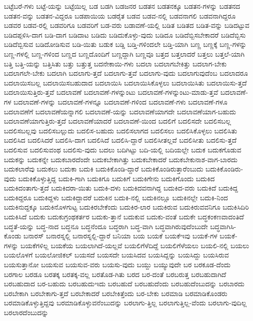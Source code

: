 {ಬಟ್ಟೆಬರೆ-ಗಳು
ಬಟ್ಟೆ-ಯನ್ನು
ಬಟ್ಟೆಯಿಲ್ಲ
ಬಡ
ಬಡಗಿ
ಬಡಜನರ
ಬಡತನ
ಬಡತನಕ್ಕೂ
ಬಡತನ-ಗಳನ್ನು
ಬಡತನದ
ಬಡತನ-ವನ್ನು
ಬಡತನ-ವಿದ್ದರೂ
ಬಡಪಾಯಿಯ
ಬಡರೈತ
ಬಡವ
ಬಡವ-ನಲ್ಲಿ
ಬಡವನಾಗಲಿ
ಬಡವನಾಗಿದ್ದರೂ
ಬಡವರ
ಬಡವ-ರಲ್ಲಿ
ಬಡವರಿಗೂ
ಬಡವರಿಗೆ
ಬಡ-ವರು
ಬಡಾವಣೆ-ಯಲ್ಲಿ
ಬಡಿತ
ಬಡಿತದ
ಬಡಿತ-ವನ್ನು
ಬಡಿದಟ್ಟುವ
ಬಡಿದಪ್ಪಳಿಸಿ-ದಾಗ
ಬಡಿ-ದಾಗ
ಬಡಿದಾಟ
ಬಡಿದು
ಬಡಿದುಕೊಳ್ಳು-ವುದು
ಬಡಿದೂ
ಬಡಿದೆಬ್ಬಿಸಬೇಕಾದರೆ
ಬಡಿದೆಬ್ಬಿಸು
ಬಡಿದೆಬ್ಬಿಸುವ
ಬಡಿದೋಡಿಸುವ
ಬಡಿ-ಯಿತು
ಬಡುಕ
ಬಡ್ಡಿ
ಬಡ್ತಿ-ಗಳಿಂದಲೇ
ಬಡ್ತಿ-ಯಾಗಿ
ಬಣ್ಣ
ಬಣ್ಣಕ್ಕೆ
ಬಣ್ಣ-ಗಳನ್ನು
ಬಣ್ಣ-ಗಳಲ್ಲಿ
ಬಣ್ಣ-ಗಳಿಂದ
ಬಣ್ಣದ
ಬಣ್ಣದೊಂದಿಗೆ
ಬಣ್ಣದ್ದಾಗಿ
ಬಣ್ಣವೂ
ಬತ್ತದ
ಬತ್ತಲಾದರೆ
ಬತ್ತಲು
ಬತ್ತಲೆ-ಯಾಗಿ
ಬತ್ತಿ
ಬತ್ತಿ-ಯನ್ನು
ಬತ್ತಿಸಿತು
ಬತ್ತು
ಬತ್ತುತ್ತ
ಬದನೇಕಾಯಿ-ಗಳು
ಬದಲಾ
ಬದಲಾಗಬೇಕಿತ್ತು
ಬದಲಾಗ-ಬೇಕು
ಬದಲಾಗಲೇ-ಬೇಕು
ಬದಲಾಗಿ
ಬದಲಾಗು-ತ್ತದೆ
ಬದಲಾಗು-ತ್ತವೆ
ಬದಲಾಗು-ವುದು
ಬದಲಾಗುವುದೆಂಬ
ಬದಲಾದರೂ
ಬದಲಾಯಿಸಬಲ್ಲ
ಬದಲಾಯಿಸಬಹುದಾದ
ಬದಲಾಯಿಸಿ
ಬದಲಾಯಿಸಿಕೊಳ್ಳಲು
ಬದಲಾಯಿಸಿತು
ಬದಲಾಯಿಸು-ತ್ತದೆ
ಬದಲಾಯಿಸುತ್ತಿರು-ತ್ತವೆ
ಬದಲಾವಣೆ
ಬದಲಾವಣೆ-ಗಳನ್ನುಂಟು
ಬದಲಾವಣೆ-ಗಳನ್ನುಂಟು-ಮಾಡು-ತ್ತವೆ
ಬದಲಾವಣೆ-ಗಳ
ಬದಲಾವಣೆ-ಗಳನ್ನು
ಬದಲಾವಣೆ-ಗಳನ್ನೂ
ಬದಲಾವಣೆ-ಗಳಿಂದ
ಬದಲಾವಣೆ-ಗಳು
ಬದಲಾವಣೆ-ಗಳೂ
ಬದಲಾವಣೆಗೆ
ಬದಲಾವಣೆಯನ್ನಾಗಲಿ
ಬದಲಾವಣೆ-ಯನ್ನು
ಬದಲಾವಣೆಯಾಗದೇ
ಬದಲಾವಣೆಯಾಗ-ಬಹುದು
ಬದಲಾವಣೆಯಾಗುತ್ತಿರು-ತ್ತದೆ
ಬದಲಾವಣೆಯಾದರೆ
ಬದಲಾವಣೆ-ಯಿಂದ
ಬದಲಿಗೆ
ಬದಲಿಸದೇ
ಬದಲಿಸಬಲ್ಲ
ಬದಲಿಸಬಲ್ಲವು
ಬದಲಿಸಬಲ್ಲುದು
ಬದಲಿಸ-ಬಹುದು
ಬದಲಿಸಲಾಗದ
ಬದಲಿಸಲು
ಬದಲಿಸಿಕೊಳ್ಳಲು
ಬದಲಿಸಿತು
ಬದಲಿಸಿದ
ಬದಲಿಸಿದರೆ
ಬದಲಿಸಿ-ದಾಗ
ಬದಲಿಸಿದೆ
ಬದಲಿಸಿ-ದ್ದಾರೆ
ಬದಲಿಸೀತಲ್ಲವೆ
ಬದಲಿಸೀತು
ಬದಲಿಸು-ತ್ತದೆ
ಬದಲಿಸುವ
ಬದಲಿಸುವಂಥ
ಬದಲಿಸು-ವುದು
ಬದಲು
ಬದಿಗಿಟ್ಟು
ಬದಿ-ಯಲ್ಲಿ
ಬದಿಯಲ್ಲೇ
ಬದುಕ
ಬದುಕಗೊಡುವ
ಬದುಕನ್ನು
ಬದುಕನ್ನೇ
ಬದುಕಬಾರದೆಂದೇ
ಬದುಕಬೇಕಾಗಿತ್ತು
ಬದುಕಬೇಕಾದರೆ
ಬದುಕಬೇಕುನಾಶ-ವಾಗ-ಬಾರದು
ಬದುಕಲಾರೆವು
ಬದುಕಲು
ಬದುಕಾ
ಬದುಕಿ
ಬದುಕಿಕೊಂಡಿ-ದ್ದಾರೆ
ಬದುಕಿಕೊಂಡಿರುತ್ತಾರೆಂಬುದು
ಬದುಕಿಕೊಂಡಿರು-ವುದು
ಬದುಕಿಕೊಳ್ಳುತ್ತಿದ್ದ
ಬದುಕಿ-ಗಾಗಿ
ಬದುಕಿಗೂ
ಬದುಕಿಗೆ
ಬದುಕಿಗೇನು
ಬದುಕಿಗೊಂದು
ಬದುಕಿದ
ಬದುಕಿದಂತಾಗು-ತ್ತದೆ
ಬದುಕಿದರಾ-ಯಿತು
ಬದುಕಿ-ದಳು
ಬದುಕಿದವನಾಗಿದ್ದ
ಬದುಕಿದ-ವರು
ಬದುಕಿದೆ
ಬದುಕಿದ್ದ
ಬದುಕಿದ್ದರೂ
ಬದುಕಿದ್ದಳು
ಬದುಕಿದ್ದಾದರೆ
ಬದುಕಿನ
ಬದುಕಿ-ನಲ್ಲಿ
ಬದುಕಿನಲ್ಲೂ
ಬದುಕಿನಲ್ಲೇ
ಬದುಕಿ-ನಿಂದ
ಬದುಕಿನುದ್ದಕ್ಕೂ
ಬದುಕಿನೊಳಗುಟ್ಟ
ಬದುಕಿರಬೇಕೆಂದು
ಬದುಕಿರ-ಲಾರ
ಬದುಕಿರುವ
ಬದುಕಿರುವವನಿಗೂ
ಬದುಕಿಸಿದಿರಿ
ಬದುಕಿಸಿದೆ
ಬದುಕು
ಬದುಕುಗ್ರಂಥಕರ್ತರ
ಬದುಕು-ತ್ತಾನೆ
ಬದುಕುವ
ಬದುಕು-ವಂತೆ
ಬದುಕೇ
ಬದ್ಧಕಂಕಣವಾದಂತಿದೆ
ಬದ್ಧತೆ-ಯನ್ನು
ಬದ್ಧ-ನಾದ
ಬದ್ಧನೂ
ಬದ್ಧನೆಂದೂ
ಬದ್ಧರಾಗಿ
ಬದ್ಧ-ವಾಗಿ
ಬದ್ಧವಾಗಿರುವುದೆಂಬುದೇ
ಬದ್ಧವಾಗಿಸಿ-ಕೊಂಡು
ಬನಾರಸ್
ಬನಾರಸ್ನಲ್ಲಿ
ಬನಾರಸ್ನಲ್ಲಿ-ದ್ದಾರೆ
ಬನಿಯಾ
ಬಯ
ಬಯಕೆ
ಬಯಕೆಇವು
ಬಯಕೆ-ಗಳ
ಬಯಕೆ-ಗಳನ್ನು
ಬಯಕೆಗಳಿಲ್ಲ
ಬಯಕೆಯ
ಬಯಲಾಗಿದೆ-ಯಲ್ಲವೆ
ಬಯಲಿಗೆಳೆದಿದ್ದೆ
ಬಯಲಿಗೆಳೆಯಲು
ಬಯಲಿ-ನಲ್ಲಿ
ಬಯಲು
ಬಯಲೊಳಗೆ
ಬಯಲೋಜಿಕಲ್
ಬಯಸದೆ
ಬಯಸದೇ
ಬಯಸಿದವ
ಬಯಸಿದ್ದನ್ನು
ಬಯಸಿದ್ದು
ಬಯಸಿರುವ
ಬಯಸುತ್ತಾನೋ
ಬಯಸುವ
ಬಯಸುವ-ವರು
ಬಯಸು-ವುದು
ಬಯ್ದು
ಬಯ್ಯುವುದೇ
ಬರ
ಬರಕೂಡ-ದೆಂದು
ಬರಗಾಲ
ಬರಡೂ
ಬರತಕ್ಕ
ಬರತಕ್ಕ-ವಲ್ಲ
ಬರತೊಡ-ಗಿತು
ಬರದ
ಬರ-ದಂತೆ
ಬರಬರುತ್ತ
ಬರಬಹುದಾಗಿದೆ
ಬರಬಹುದಾದ
ಬರ-ಬಹುದು
ಬರಬಹುದುಇದು
ಬರಬಹುದೆ
ಬರಬಹುದೆಂದು
ಬರಬಹುದೆಂಬುದನ್ನು
ಬರಬಾರದು
ಬರಬೇಕಾಗಿ
ಬರಬೇಕಾಗು-ತ್ತದೆ
ಬರಬೇಕಾದರೆ
ಬರಬೇಕಿತ್ತೆಂದು
ಬರ-ಬೇಕು
ಬರಮಾಡಿ
ಬರಮಾಡಿಕೊಂಡರು
ಬರಮಾಡಿಕೊಳ್ಳುತ್ತಿದ್ದವು
ಬರಮಾಡಿಕೊಳ್ಳುವನೆಂಬುದನ್ನು
ಬರಲಾಗು-ತ್ತಿಲ್ಲ
ಬರಲಾಗುತ್ತಿಲ್ಲ-ವೆಂದು
ಬರಲಾಗು-ವುದಿಲ್ಲ
ಬರಲಾರದೆಂಬುದನ್ನು
}
